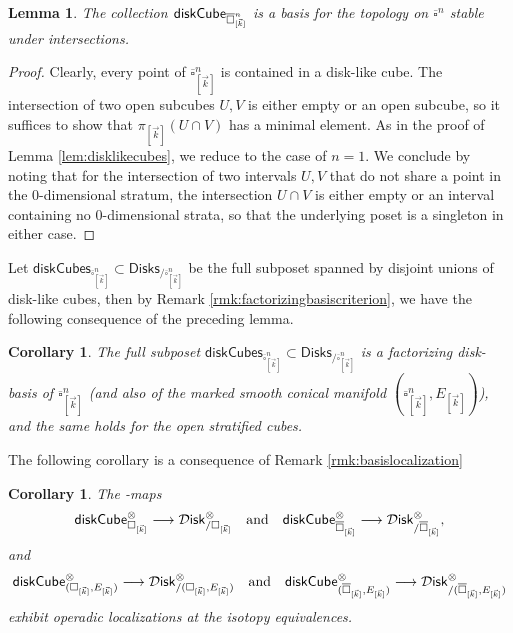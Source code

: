 \documentclass[10pt, reqno, twoside
, final
]{amsart}
\numberwithin{equation}{subsection}%
\theoremstyle{definition}
\theoremstyle{definition}
\theoremstyle{definition}
\theoremstyle{definition}
\theoremstyle{definition}
\theoremstyle{definition}
\theoremstyle{definition}
\theoremstyle{definition}
\theoremstyle{definition}
\theoremstyle{plain}
\theoremstyle{definition}
\theoremstyle{plain}
\theoremstyle{definition}
\theoremstyle{plain}
\newtheorem{cor}[defn]{Corollary}
\theoremstyle{definition}
\theoremstyle{definition}
\theoremstyle{plain}
\newtheorem{lem}[defn]{Lemma}
\theoremstyle{plain}
\theoremstyle{definition}
\theoremstyle{plain}
\theoremstyle{plain}
\theoremstyle{plain}
\begin{document}
\begin{lem}
The collection $\mathsf{diskCube}_{\overline{\square}^n_{[\vec{k}]}}$ is a basis for the topology on $\overline{\square}^n$ stable under intersections.
\end{lem}
\begin{proof}
Clearly, every point of $\overline{\square}_{[\vec{k}]}^n$ is contained in a disk-like cube. The intersection of two open subcubes $U,V$ is either empty or an open subcube, so it suffices to show that $\pi_{[\vec{k}]}(U\cap V)$ has a minimal element. As in the proof of Lemma \ref{lem:disklikecubes}, we reduce to the case of $n=1$. We conclude by noting that for the intersection of two intervals $U,V$ that do not share a point in the 0-dimensional stratum, the intersection $U\cap V$ is either empty or an interval containing no 0-dimensional strata, so that the underlying poset is a singleton in either case. 
\end{proof}
Let $\mathsf{diskCubes}_{\overline{\square}^n_{[\vec{k}]}}\subset \mathsf{Disks}_{/\overline{\square}^n_{[\vec{k}]}}$ be the full subposet spanned by disjoint unions of disk-like cubes, then by Remark \ref{rmk:factorizingbasiscriterion}, we have the following consequence of the preceding lemma.
\begin{cor}\label{cor:factorizingbasisbycubes}
The full subposet $\mathsf{diskCubes}_{\overline{\square}^n_{[\vec{k}]}}\subset \mathsf{Disks}_{/\overline{\square}^n_{[\vec{k}]}}$ is a factorizing disk-basis of $\overline{\square}^n_{[\vec{k}]}$ (and also of the \emph{marked} smooth conical manifold $(\overline{\square}^n_{[\vec{k}]},E_{[\vec{k}]})$), and the same holds for the open stratified cubes.
\end{cor}

The following corollary is a consequence of Remark \ref{rmk:basislocalization} 

\begin{cor}\label{cor:cubelocalization}
The \infopt-maps 
\[  \mathsf{diskCube}_{\square_{[\vec{k}]}}^{\otimes} \longrightarrow \mathcal{D}\mathsf{isk}_{/\square_{[\vec{k}]}}^{\otimes}\quad \text{and} \quad \mathsf{diskCube}_{\overline{\square}_{[\vec{k}]}}^{\otimes} \longrightarrow \mathcal{D}\mathsf{isk}_{/\overline{\square}_{[\vec{k}]}}^{\otimes},  \]
and
\[  \mathsf{diskCube}_{(\square_{[\vec{k}]},E_{[\vec{k}]})}^{\otimes} \longrightarrow \mathcal{D}\mathsf{isk}_{/(\square_{[\vec{k}]},E_{[\vec{k}]})}^{\otimes}\quad \text{and}\quad  \mathsf{diskCube}_{(\overline{\square}_{[\vec{k}]},E_{[\vec{k}]})}^{\otimes} \longrightarrow \mathcal{D}\mathsf{isk}_{/(\overline{\square}_{[\vec{k}]},E_{[\vec{k}]})}^{\otimes}  \]
exhibit operadic localizations at the isotopy equivalences.
\end{cor}
\end{document}
